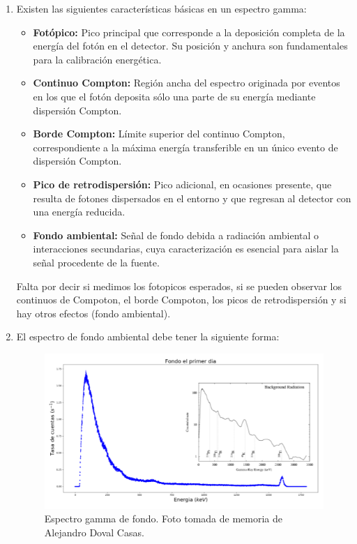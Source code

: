 \documentclass[11pt]{article}
\begin{document}
\begin{enumerate}[label=\alph*)]
    \item Existen las siguientes características básicas en un espectro gamma:
    \begin{itemize}
        \item \textbf{Fotópico:} Pico principal que corresponde a la deposición completa de la energía del fotón en el detector. Su posición y anchura son fundamentales para la calibración energética.
        \item \textbf{Continuo Compton:} Región ancha del espectro originada por eventos en los que el fotón deposita sólo una parte de su energía mediante dispersión Compton.
        \item \textbf{Borde Compton:} Límite superior del continuo Compton, correspondiente a la máxima energía transferible en un único evento de dispersión Compton.
        \item \textbf{Pico de retrodispersión:} Pico adicional, en ocasiones presente, que resulta de fotones dispersados en el entorno y que regresan al detector con una energía reducida.
        \item \textbf{Fondo ambiental:} Señal de fondo debida a radiación ambiental o interacciones secundarias, cuya caracterización es esencial para aislar la señal procedente de la fuente.
    \end{itemize}
    \textcolor{BrickRed}{Falta por decir si medimos los fotopicos esperados, si se pueden observar los continuos de Compoton, el borde Compoton, los picos de retrodispersión y si hay otros efectos (fondo ambiental).}
    \item El espectro de fondo ambiental debe tener la siguiente forma:
    \begin{figure}[h!] \centering
        \includegraphics[width=0.6\linewidth]{Espectro_Fondo.png}
        \caption{Espectro gamma de fondo. Foto tomada de memoria de Alejandro Doval Casas.}      
    \end{figure}


\end{enumerate}
\end{document}
